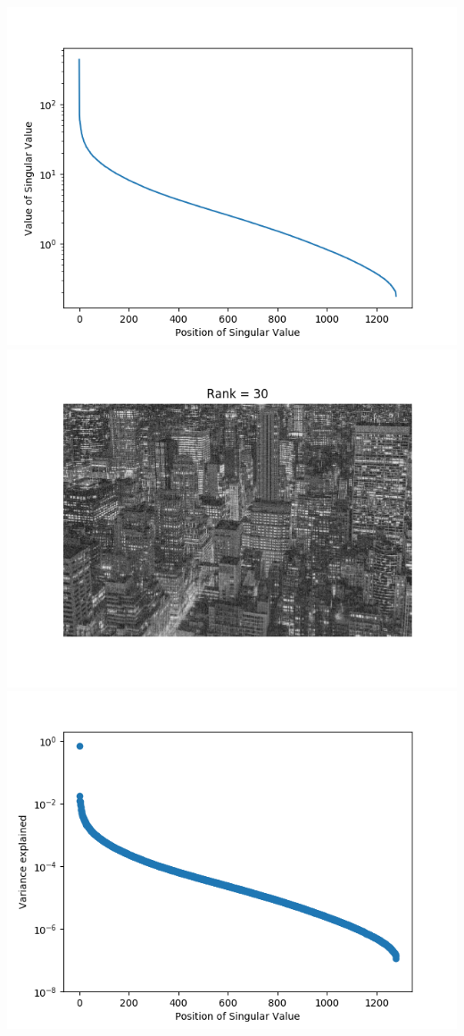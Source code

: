 \documentclass[11pt]{article}
\begin{document}
\begin{enumerate}
\includegraphics[scale=.55]{ny_sv.png}\\
\includegraphics[scale=.55]{ny_compress_30.png}
\includegraphics[scale=.55]{ny_var.png}\\

\end{enumerate}
\end{document}
